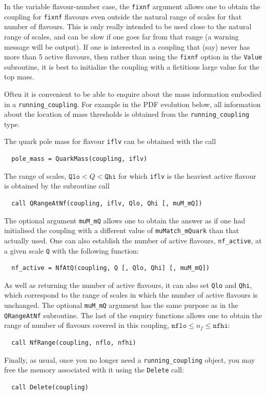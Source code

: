 \documentclass[12pt]{article}
\newcommand{\ttt}[1]{\texttt{#1}}
\begin{document}
In the variable flavour-number case, the \ttt{fixnf} argument allows
one to obtain the coupling for \ttt{fixnf} flavours even outside the
natural range of scales for that number of flavours. This is only
really intended to be used close to the natural range of scales, and
can be slow if one goes far from that range (a warning message will be
output). If one is interested in a coupling that (say) never has more
than 5 active flavours, then rather than using the \ttt{fixnf} option
in the \ttt{Value} subroutine, it is best to initialize the coupling
with a fictitious large value for the top mass.

Often it is convenient to be able to enquire about the mass information
embodied in a \ttt{running\_coupling}. For example in the PDF
evolution below, all information about the location of mass thresholds is
obtained from the \ttt{running\_coupling} type.

The quark pole mass for flavour \ttt{iflv} can be obtained with the
call
\begin{lstlisting}
  pole_mass = QuarkMass(coupling, iflv)
\end{lstlisting}
The range of scales, $\ttt{Qlo} < Q < \ttt{Qhi}$ for which \ttt{iflv}
is the heaviest active flavour is obtained by the subroutine call
\begin{lstlisting}
  call QRangeAtNf(coupling, iflv, Qlo, Qhi [, muM_mQ])
\end{lstlisting}
The optional argument \ttt{muM\_mQ} allows one to obtain the answer as
if one had initialised the coupling with a different value of
\ttt{muMatch\_mQuark} than that actually used. One can also establish
the number of active flavours, \ttt{nf\_active}, at a given scale
\ttt{Q} with the following function:
\begin{lstlisting}
  nf_active = NfAtQ(coupling, Q [, Qlo, Qhi] [, muM_mQ])
\end{lstlisting}
As well as returning the number of active flavours, it can also set
\ttt{Qlo} and \ttt{Qhi}, which correspond to the range of scales in
which the number of active flavours is unchanged. The optional
\ttt{muM\_mQ} argument has the same purpose as in the \ttt{QRangeAtNf}
subroutine. The last of the enquiry functions allows one to obtain the
range of number of flavours covered in this coupling, $\ttt{nflo} \le
n_f \le \ttt{nfhi}$:
\begin{lstlisting}
  call NfRange(coupling, nflo, nfhi)
\end{lstlisting}

Finally, as usual, once you no longer need a \ttt{running\_coupling}
object, you may free the memory associated with it using the
\ttt{Delete} call:
\begin{lstlisting}
  call Delete(coupling)
\end{lstlisting}
\end{document}
